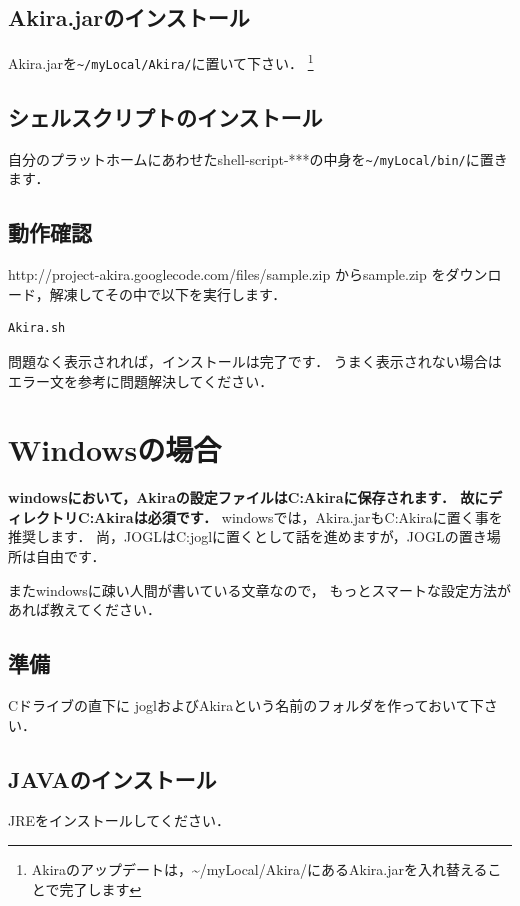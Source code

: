 \documentclass[a4j,openany]{jbook}
\begin{document}
  \subsection{Akira.jarのインストール}
  Akira.jarを\verb|~/myLocal/Akira/|に置いて下さい．
  \footnote{Akiraのアップデートは，\~{}/myLocal/Akira/にあるAkira.jarを入れ替えることで完了します}
  \subsection{シェルスクリプトのインストール}
  自分のプラットホームにあわせたshell-script-***の中身を\verb|~/myLocal/bin/|に置きます．


  \subsection{動作確認}
  {http://project-akira.googlecode.com/files/sample.zip}
  からsample.zip
  をダウンロード，解凍してその中で以下を実行します．
   \begin{screen}
\begin{verbatim}
Akira.sh
\end{verbatim}
   \end{screen}
   問題なく表示されれば，インストールは完了です．
   うまく表示されない場合はエラー文を参考に問題解決してください．

 \section{Windowsの場合}
 {\bf windowsにおいて，Akiraの設定ファイルはC:Akiraに保存されます．
 故にディレクトリC:Akiraは必須です．}
 windowsでは，Akira.jarもC:Akiraに置く事を推奨します．
 尚，JOGLはC:joglに置くとして話を進めますが，JOGLの置き場所は自由です．

 またwindowsに疎い人間が書いている文章なので，
 もっとスマートな設定方法があれば教えてください．

  \subsection{準備}
  Cドライブの直下に
  joglおよびAkiraという名前のフォルダを作っておいて下さい．

  \subsection{JAVAのインストール}
  JREをインストールしてください．
\end{document}
